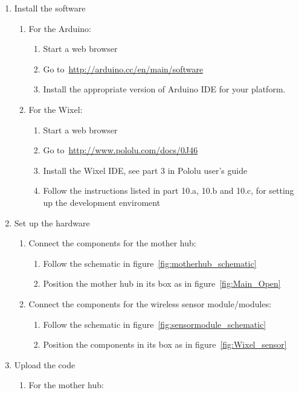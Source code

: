 \begin{enumerate}
\item Install the software
	\begin{enumerate}
	\item For the Arduino:
		\begin{enumerate}
		\item Start a web browser
		\item Go to~\url{http://arduino.cc/en/main/software}
		\item Install the appropriate version of Arduino IDE for your platform.
		\end{enumerate}
	\item For the Wixel:
		\begin{enumerate}
		\item Start a web browser
		\item Go to~\url{http://www.pololu.com/docs/0J46}
		\item Install the Wixel IDE, see part 3 in Pololu user's guide
		\item Follow the instructions listed in part 10.a, 10.b and 10.c, for setting up the development enviroment
		\end{enumerate}
	\end{enumerate}
\item Set up the hardware
	\begin{enumerate}
	\item Connect the components for the mother hub:
		\begin{enumerate}
		\item Follow the schematic in figure~\ref{fig:motherhub_schematic}
		\item Position the mother hub in its box as in figure~\ref{fig:Main_Open}
		\end{enumerate}
	\item Connect the components for the wireless sensor module/modules:
		\begin{enumerate}
		\item Follow the schematic in figure~\ref{fig:sensormodule_schematic}
		\item Position the components in its box as in figure~\ref{fig:Wixel_sensor}
		\end{enumerate}
	\end{enumerate}
\item Upload the code
	\begin{enumerate}
	\item For the mother hub:
		\begin{enumerate}

\end{enumerate}
\end{enumerate}
\end{enumerate}

